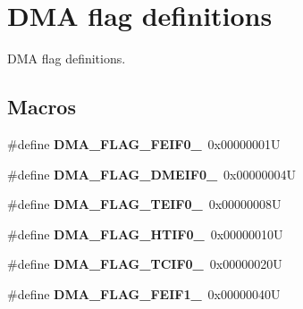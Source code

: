 \hypertarget{group___d_m_a__flag__definitions}{}\section{D\+MA flag definitions}
\label{group___d_m_a__flag__definitions}


D\+MA flag definitions.  


\subsection*{Macros}
\begin{DoxyCompactItemize}
\item 
\mbox{\label{group___d_m_a__flag__definitions_ga6f44b274316a463c9302d770b8205640}} 
\#define {\bfseries D\+M\+A\+\_\+\+F\+L\+A\+G\+\_\+\+F\+E\+I\+F0\+\_}~0x00000001U
\item 
\mbox{\label{group___d_m_a__flag__definitions_gaee0e6da831d62bc84e9e28e59b8e9ede}} 
\#define {\bfseries D\+M\+A\+\_\+\+F\+L\+A\+G\+\_\+\+D\+M\+E\+I\+F0\+\_}~0x00000004U
\item 
\mbox{\label{group___d_m_a__flag__definitions_gab98ef70ba0c1498d4c967a10b3f6e67f}} 
\#define {\bfseries D\+M\+A\+\_\+\+F\+L\+A\+G\+\_\+\+T\+E\+I\+F0\+\_}~0x00000008U
\item 
\mbox{\label{group___d_m_a__flag__definitions_ga976fee242270824013f1fc0b6bd4c446}} 
\#define {\bfseries D\+M\+A\+\_\+\+F\+L\+A\+G\+\_\+\+H\+T\+I\+F0\+\_}~0x00000010U
\item 
\mbox{\label{group___d_m_a__flag__definitions_ga19dfe70176841c6972818e279ba02436}} 
\#define {\bfseries D\+M\+A\+\_\+\+F\+L\+A\+G\+\_\+\+T\+C\+I\+F0\+\_}~0x00000020U
\item 
\mbox{\label{group___d_m_a__flag__definitions_ga16a04159a9a7c434ac02e5c6ff630b2e}} 
\#define {\bfseries D\+M\+A\+\_\+\+F\+L\+A\+G\+\_\+\+F\+E\+I\+F1\+\_}~0x00000040U
\item 
\mbox{\label{group___d_m_a__flag__definitions_gaae665bbda7f888f0b8ac3d10688bfc5d}} 

\end{DoxyCompactItemize}
